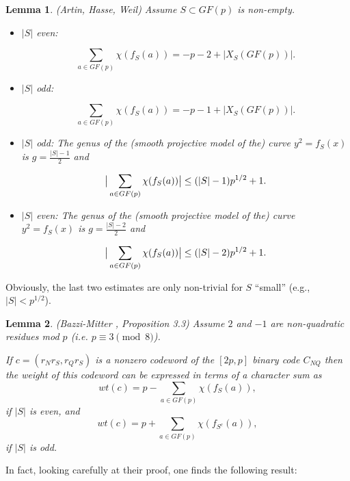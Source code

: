 \documentclass[submission%
]{dmtcs}
\newtheorem{lemma}{Lemma}
\begin{document}
\begin{lemma}
(Artin, Hasse, Weil)
\label{remark:hyperelliptic}
Assume $S\subset GF(p)$ is non-empty.
\begin{itemize}
\item
$|S|$ even: 

\[
\sum_{a\in GF(p)} \chi(f_S(a))
=-p-2+|X_S(GF(p))|.
\]

\item
$|S|$ odd: 

\[
\sum_{a\in GF(p)} \chi(f_S(a))
=-p-1+|X_S(GF(p))|.
\]

\item
$|S|$ odd: The genus of the (smooth projective model of the)
curve $y^2=f_S(x)$ is $g=\frac{|S|-1}{2}$ and

\[
\big{|}\sum_{a\in GF(p)} \chi(f_S(a))\big{|}
\leq (|S|-1)p^{1/2}+1.
\]

\item
$|S|$ even: The genus of the (smooth projective model of the)
curve $y^2=f_S(x)$ is $g=\frac{|S|-2}{2}$ and

\[
\big{|}\sum_{a\in GF(p)} \chi(f_S(a))\big{|}
\leq (|S|-2)p^{1/2}+1.
\]

\end{itemize}

\end{lemma}

Obviously, the last two estimates are only non-trivial
for $S$ ``small'' (e.g., $|S|<p^{1/2}$).

\begin{lemma}
(Bazzi-Mitter \cite{BM}, Proposition 3.3)
Assume $2$ and $-1$ are non-quadratic residues mod $p$ (i.e. 
$p \equiv 3 \pmod 8$). 


If $c=(r_N r_S, r_Q r_S)$ is a nonzero
codeword of the $[2p,p]$ binary code $C_{NQ}$ then the 
weight of this codeword can be expressed
in terms of a character sum as
\[
wt(c)=p - \sum_{a\in GF(p)} \chi(f_S(a)),
\]
if $|S|$ is even, and
\[
wt(c)=p +  \sum_{a\in GF(p)} \chi(f_{S^c}(a)),
\]
if $|S|$ is odd. 
\end{lemma}


In fact, looking carefully at their proof, one finds the following result:
\end{document}
